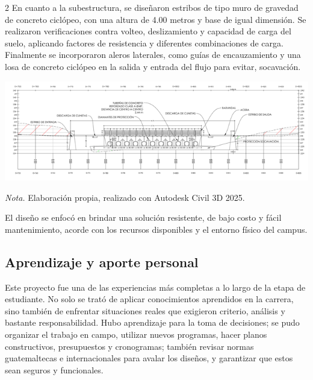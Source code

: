 \documentclass[12pt,spanish,Letterpaper,openany]{book}
\begin{document}
\begin {multicols}{2}
En cuanto a la subestructura, se diseñaron estribos de tipo muro de gravedad de concreto ciclópeo, con una altura de 4.00 metros y base de igual dimensión. Se realizaron verificaciones contra volteo, deslizamiento y capacidad de carga del suelo, aplicando factores de resistencia y diferentes combinaciones de carga. Finalmente se incorporaron aleros laterales, como guías de encauzamiento y una losa de concreto ciclópeo en la salida y entrada del flujo para evitar, socavación.

\begin {flushleft}
\noindent\begin{minipage}[c]{\columnwidth}

\textbf{}

\begin{center}\includegraphics[width=0.95\linewidth]{imagenes_articulos/art03_05} \end{center}

\emph{Nota.} Elaboración propia, realizado con Autodesk Civil 3D 2025.

\end{minipage}
\end {flushleft}

El diseño se enfocó en brindar una solución resistente, de bajo costo y fácil mantenimiento, acorde con los recursos disponibles y el entorno físico del campus.

\hypertarget{aprendizaje-y-aporte-personal}{%
\subsection{Aprendizaje y aporte personal}\label{aprendizaje-y-aporte-personal}}

Este proyecto fue una de las experiencias más completas a lo largo de la etapa de estudiante. No solo se trató de aplicar conocimientos aprendidos en la carrera, sino también de enfrentar situaciones reales que exigieron criterio, análisis y bastante responsabilidad. Hubo aprendizaje para la toma de decisiones; se pudo organizar el trabajo en campo, utilizar nuevos programas, hacer planos constructivos, presupuestos y cronogramas; también revisar normas guatemaltecas e internacionales para avalar los diseños, y garantizar que estos sean seguros y funcionales.


\end{multicols}
\end{document}
